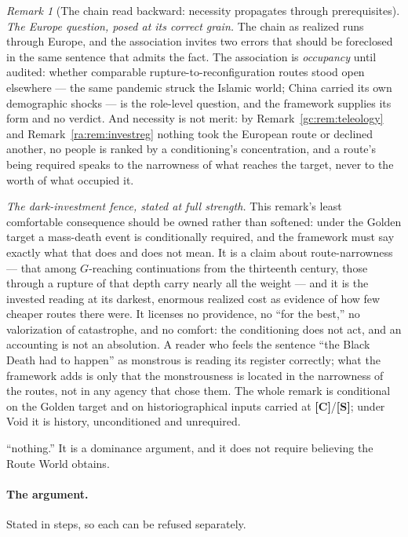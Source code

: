 \documentclass[11pt]{article}
\numberwithin{equation}{section}
\theoremstyle{plain}
\theoremstyle{definition}
\theoremstyle{remark}
\newtheorem{remark}[theorem]{Remark}
\begin{document}
\begin{remark}[The chain read backward: necessity propagates through
prerequisites]
\emph{The Europe question, posed at its correct grain.} The chain as
realized runs through Europe, and the association invites two errors
that should be foreclosed in the same sentence that admits the fact.
The association is \emph{occupancy} until audited: whether comparable
rupture-to-reconfiguration routes stood open elsewhere --- the same
pandemic struck the Islamic world; China carried its own
demographic shocks --- is the role-level question, and the framework
supplies its form and no verdict. And necessity is not merit:
by Remark~\ref{gc:rem:teleology} and Remark~\ref{ra:rem:investreg}
nothing took the European route or declined another, no people is
ranked by a conditioning's concentration, and a route's being
required speaks to the narrowness of what reaches the target, never
to the worth of what occupied it.

\emph{The dark-investment fence, stated at full strength.} This
remark's least comfortable consequence should be owned rather than
softened: under the Golden target a mass-death event is conditionally
required, and the framework must say exactly what that does and does
not mean. It is a claim about route-narrowness --- that among
$G$-reaching continuations from the thirteenth century, those through
a rupture of that depth carry nearly all the weight --- and it is the
invested reading at its darkest, enormous realized cost as evidence
of how few cheaper routes there were. It licenses no providence, no
``for the best,'' no valorization of catastrophe, and no comfort:
the conditioning does not act, and an accounting is not an
absolution. A reader who feels the sentence ``the Black Death had to
happen'' as monstrous is reading its register correctly; what the
framework adds is only that the monstrousness is located in the
narrowness of the routes, not in any agency that chose them. The
whole remark is conditional on the Golden target and on
historiographical inputs carried at \textbf{[C]}/\textbf{[S]};
under Void it is history, unconditioned and unrequired.
\end{remark}

``nothing.'' It is a dominance argument, and it does not require
believing the Route World obtains.

\paragraph{The argument.} Stated in steps, so each can be refused
separately.
\end{document}
